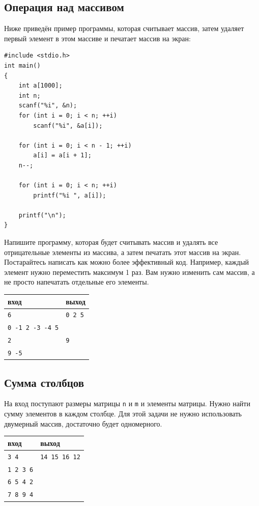 \documentclass[10pt]{article}
\begin{document}
\subsection{Операция над массивом}
Ниже приведён пример программы, которая считывает массив, затем удаляет первый элемент в этом массиве и печатает массив на экран:
\begin{lstlisting}
#include <stdio.h>
int main() 
{
    int a[1000];
    int n;
    scanf("%i", &n);
    for (int i = 0; i < n; ++i)
        scanf("%i", &a[i]);
 
    for (int i = 0; i < n - 1; ++i)
        a[i] = a[i + 1];
    n--;    
    
    for (int i = 0; i < n; ++i)
        printf("%i ", a[i]);

    printf("\n");
}
\end{lstlisting}
Напишите программу, которая будет считывать массив и удалять все отрицательные элементы из массива, а затем печатать этот массив на экран. Постарайтесь написать как можно более эффективный код. Например, каждый элемент нужно переместить максимум 1 раз. Вам нужно изменить сам массив, а не просто напечатать отдельные его элементы.
\begin{center}
\begin{tabular}{ l | l }
 вход & выход \\ \hline
 \texttt{6} & \texttt{0 2 5}  \\  
 \texttt{0 -1 2 -3 -4 5} &  \\ \hline
 \texttt{2} & \texttt{9}  \\  
 \texttt{9 -5} &  \\ 
\end{tabular}
\end{center}



\subsection{Сумма столбцов}
На вход поступают размеры матрицы \texttt{n} и \texttt{m} и элементы матрицы. Нужно найти сумму элементов в каждом столбце. Для этой задачи не нужно использовать двумерный массив, достаточно будет одномерного.
\begin{center}
\begin{tabular}{ l | l }
 вход & выход \\ \hline
 \texttt{3 4} &    \texttt{14 15 16 12}  \\ 
 \texttt{1 2 3 6} &  \\
 \texttt{6 5 4 2} &  \\ 
 \texttt{7 8 9 4} &  \\ 
\end{tabular}
\end{center}
\end{document}
